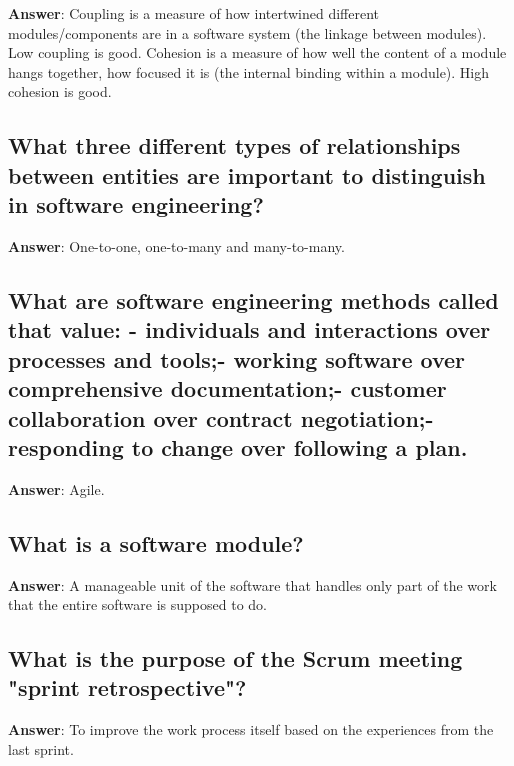 \documentclass[a4paper,11pt,oneside]{article}
\begin{document}
\begin{sloppypar}
\label{q:239:sa:en:True}

\textbf{Answer}: Coupling is a measure of how intertwined different modules/components are in a software system (the linkage between modules). Low coupling is good. Cohesion is a measure of how well the content of a module hangs together, how focused it is (the internal binding within a module). High cohesion is good.



\subsection{What three different types of relationships between entities are important to distinguish in software engineering?}

\label{q:240:sa:en:True}

\textbf{Answer}: One-to-one, one-to-many and many-to-many.



\subsection{What are software engineering methods called that value: - individuals and interactions over processes and tools;- working software over comprehensive documentation;- customer collaboration over contract negotiation;- responding to change over following a plan.}

\label{q:241:sa:en:True}

\textbf{Answer}: Agile.



\subsection{What is a software module?}

\label{q:242:sa:en:True}

\textbf{Answer}: A manageable unit of the software that handles only part of the work that the entire software is supposed to do.



\subsection{What is the purpose of the Scrum meeting "sprint retrospective"?}

\label{q:243:sa:en:True}

\textbf{Answer}: To improve the work process itself based on the experiences from the last sprint.




\end{sloppypar}
\end{document}
